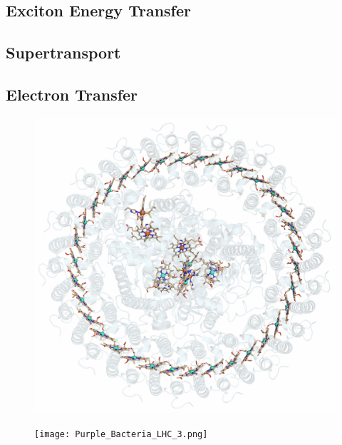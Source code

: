 \documentclass[9pt]{report}
\begin{document}
\subsection{Exciton Energy Transfer}

\subsection{Supertransport}

\subsection{Electron Transfer}





\begin{figure}
	\centering
	\includegraphics[width=\textwidth]{Purple_Bacteria_LHC_2.png}
\end{figure}

\begin{figure}
	\centering
	\texttt{[image: Purple\_Bacteria\_LHC\_3.png]}
\end{figure}
\end{document}
